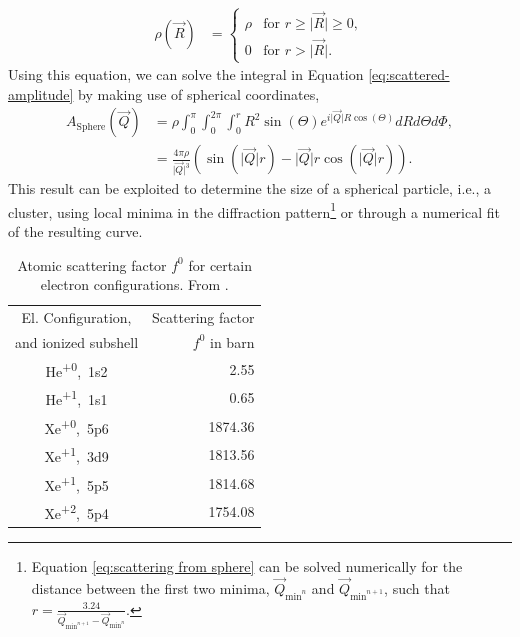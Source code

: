 \begin{align}
\rho\left(\vec{R}\right)&=\begin{cases}
\rho& \text{for $r \geq \lvert\vec{R}\rvert \geq 0$},\\
0&\text{for $r > \lvert\vec{R}\rvert$}.
\end{cases}
\label{eq:el-density}
\end{align}
Using this equation, we can solve the integral in Equation \eqref{eq:scattered-amplitude} by making use of spherical coordinates,
\begin{align}
A_{\text{Sphere}}\left(\vec{Q}\right) &= \rho \int_{0}^{\pi}\int_{0}^{2\pi}\int_{0}^{r} R^{2}  \sin\left(\Theta\right) e^{i \lvert\vec{Q}\rvert R \cos\left(\Theta\right)} dR d\Theta d\Phi,\\
&=\frac{4 \pi \rho}{\lvert\vec{Q}\rvert^{3}}\left(\sin\left(\lvert\vec{Q}\rvert r\right)-\lvert\vec{Q}\rvert r\cos\left(\lvert\vec{Q}\rvert r\right)\right).
\label{eq:scattering from sphere}
\end{align}
This result can be exploited to determine the size of a spherical particle, i.e., a cluster, using local minima in the diffraction pattern\footnote{Equation \eqref{eq:scattering from sphere} can be solved numerically for the distance between the first two minima, $\vec{Q}_{\text{min}^{n}}$ and $\vec{Q}_{\text{min}^{n+1}}$, such that $r=\frac{3.24}{\vec{Q}_{\text{min}^{n+1}}-\vec{Q}_{\text{min}^{n}}}$.} or through a numerical fit of the resulting curve.\\[1\baselineskip]
%
\begin{table}
	\centering
		\begin{tabular}{ | c | r | }
		\hline
			El. Configuration, & Scattering factor \\
			and ionized subshell & $f^{0}$ in barn \\ \hline
			He\textsuperscript{+0},\ 1s2 & 2.55  \\ \hline
			He\textsuperscript{+1},\ 1s1 & 0.65  \\ \hline
			Xe\textsuperscript{+0},\ 5p6 & 1874.36  \\ \hline
			Xe\textsuperscript{+1},\ 3d9 & 1813.56  \\ \hline
			Xe\textsuperscript{+1},\ 5p5 & 1814.68  \\ \hline
			Xe\textsuperscript{+2},\ 5p4 & 1754.08  \\ \hline
		\end{tabular}
	\caption[Atomic scattering factors for helium and xenon.]{Atomic scattering factor $f^{0}$ for certain electron configurations. From \citep{Ho-2016-PC}.}
	\label{tab:helium-xenon-el-scattering-crossection}
\end{table}
